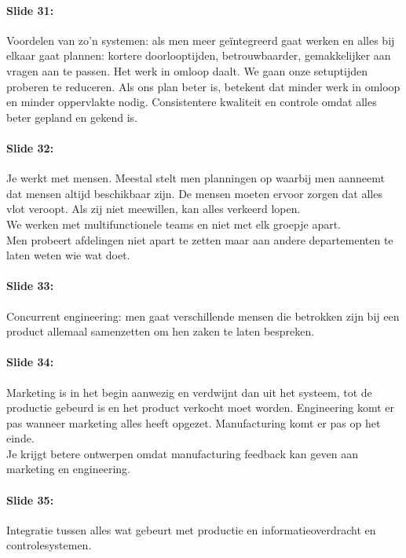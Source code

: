 \documentclass[10pt,a4paper]{report}
\begin{document}
\paragraph{Slide 31:} Voordelen van zo'n systemen: als men meer ge\"integreerd gaat werken en alles bij elkaar gaat plannen: kortere doorlooptijden, betrouwbaarder, gemakkelijker aan vragen aan te passen. Het werk in omloop daalt. We gaan onze setuptijden proberen te reduceren. Als ons plan beter is, betekent dat minder werk in omloop en minder oppervlakte nodig. Consistentere kwaliteit en controle omdat alles beter gepland en gekend is.

\paragraph{Slide 32:} Je werkt met mensen. Meestal stelt men planningen op waarbij men aanneemt dat mensen altijd beschikbaar zijn. De mensen moeten ervoor zorgen dat alles vlot veroopt. Als zij niet meewillen, kan alles verkeerd lopen.\\
We werken met multifunctionele teams en niet met elk groepje apart. \\
Men probeert afdelingen niet apart te zetten maar aan andere departementen te laten weten wie wat doet.

\paragraph{Slide 33:} Concurrent engineering: men gaat verschillende mensen die betrokken zijn bij een product allemaal samenzetten om hen zaken te laten bespreken. 

\paragraph{Slide 34:} Marketing is in het begin aanwezig en verdwijnt dan uit het systeem, tot de productie gebeurd is en het product verkocht moet worden. Engineering komt er pas wanneer marketing alles heeft opgezet. Manufacturing komt er pas op het einde.\\
Je krijgt betere ontwerpen omdat manufacturing feedback kan geven aan marketing en engineering. 

\paragraph{Slide 35:} Integratie tussen alles wat gebeurt met productie en informatieoverdracht en controlesystemen.
\end{document}
